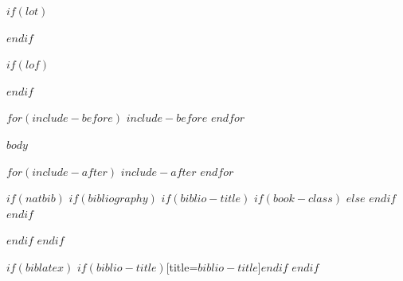 \documentclass[
    $if(fontsize)$$fontsize$$else$10pt$endif$,
    $if(papersize)$$papersize$$else$letterpaper$endif$,
    titlepage,
    oneside,
    openright,
    $if(draft)$draft$else$final$endif$,
    article]{memoir}
\begin{document}
$if(lot)$
\listoftables
\pagebreak
\cleardoublepage
$endif$



$if(lof)$
\listoffigures
\pagebreak
\cleardoublepage
$endif$



$for(include-before)$
$include-before$
\pagebreak
\cleardoublepage
$endfor$



\mainmatter

$body$
\pagebreak
\cleardoublepage



\appendix

$for(include-after)$
$include-after$
\pagebreak
\cleardoublepage
$endfor$



\backmatter

$if(natbib)$
    $if(bibliography)$
        $if(biblio-title)$
            $if(book-class)$
                \renewcommand\bibname{$biblio-title$}
            $else$
                \renewcommand\refname{$biblio-title$}
            $endif$
        $endif$
        
    $endif$
$endif$

$if(biblatex)$
    \printbibliography$if(biblio-title)$[title=$biblio-title$]$endif$
$endif$



\end{document}
